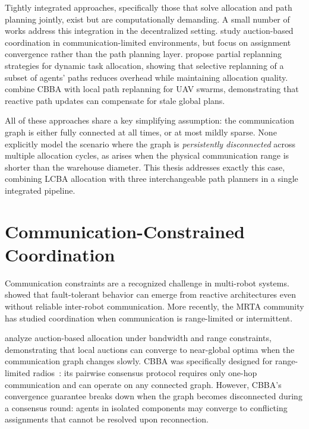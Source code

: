 Tightly integrated approaches, specifically those that solve allocation and path planning
jointly, exist but are computationally demanding.
A small number of works address this integration in the decentralized setting.
\citet{otte2020auctions} study auction-based coordination in communication-limited
environments, but focus on assignment convergence rather than the path planning
layer.
\citet{buckman2019partial} propose partial replanning strategies for dynamic
task allocation, showing that selective replanning of a subset of agents'
paths reduces overhead while maintaining allocation quality.
\citet{chen2021cbbalr} combine CBBA with local path replanning for UAV swarms,
demonstrating that reactive path updates can compensate for stale global plans.

All of these approaches share a key simplifying assumption: the communication
graph is either fully connected at all times, or at most mildly sparse.
None explicitly model the scenario where the graph is \emph{persistently
disconnected} across multiple allocation cycles, as arises when the physical
communication range is shorter than the warehouse diameter.
This thesis addresses exactly this case, combining LCBA allocation
with three interchangeable path planners in a single integrated pipeline.


\section{Communication-Constrained Coordination}
\label{sec:bg_communication}

Communication constraints are a recognized challenge in multi-robot systems.
\citet{parker1998alliance} showed that fault-tolerant behavior can emerge from
reactive architectures even without reliable inter-robot communication.
More recently, the MRTA community has studied coordination when communication
is range-limited or intermittent.

\citet{otte2020auctions} analyze auction-based allocation under bandwidth and
range constraints, demonstrating that local auctions can converge to near-global
optima when the communication graph changes slowly.
CBBA was specifically designed for range-limited radios~\cite{choi2009consensus}:
its pairwise consensus protocol requires only one-hop communication and can
operate on any connected graph.
However, CBBA's convergence guarantee breaks down when the graph becomes
disconnected during a consensus round: agents in isolated components may
converge to conflicting assignments that cannot be resolved upon reconnection.

